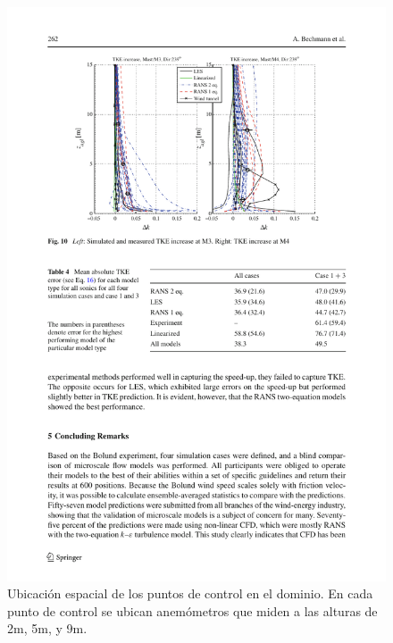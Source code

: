 \begin{figure}[H]
	\includegraphics[width=1\linewidth,trim={2.7cm 14.3cm 1.9cm 2cm},clip]{bolund5.pdf}%
	\caption{Ubicación espacial de los puntos de control en el dominio. En cada punto de control se ubican anemómetros que miden a las alturas de 2m, 5m, y 9m.}
	\label{fig:an1_delta_tke_mast}
\end{figure}
